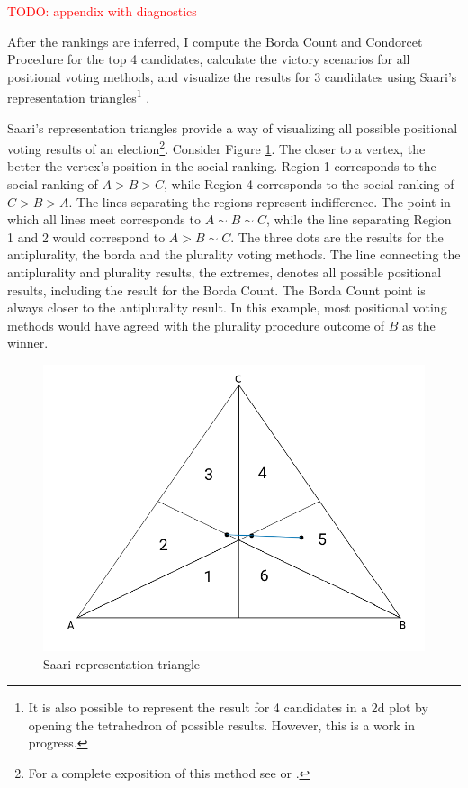 \documentclass[hidelinks,11pt]{article}
\begin{document}
\textcolor{red}{TODO: appendix with diagnostics}

After the rankings are inferred, I compute the Borda Count and Condorcet Procedure for the top
4 candidates, calculate the victory scenarios for all positional voting methods,  and visualize the results for 3 candidates using Saari's representation triangles\footnote{It is also possible to represent the result for 4 candidates in a 2d plot by opening the tetrahedron of possible results\parencite{saari2001chaotic}. However, this is a work in progress.} \parencite{saari2012geometry}.

Saari's representation triangles provide a way of visualizing all possible
positional voting results of an election\footnote{For a complete exposition of
  this method see \textcite{saari1995basic} or \textcite{nurmi2002voting}.}. Consider Figure \ref{fig:saari_nurmi}. The closer to a vertex, the better the vertex's position in the social ranking. Region 1 corresponds to the social ranking of \(A > B > C\), while Region 4 corresponds to the social ranking of \(C>B>A\). The lines separating the regions represent indifference. The point in which all lines meet corresponds to \(A \sim B \sim C\), while the line separating Region 1 and 2 would correspond to \(A > B \sim C\). The three dots are the results for the antiplurality, the borda and the plurality voting methods. The line connecting the antiplurality and plurality results, the extremes, denotes all possible positional results, including the result for the Borda Count. The Borda Count point is always closer to the antiplurality result. In this example, most positional voting methods would have agreed with the plurality procedure outcome of \(B\) as the winner.

\begin{figure}[H]
 \centering
 \includegraphics[width=0.8\columnwidth,
 height=0.3\textheight]{./images/simpletriangle.png}
 \caption{Saari representation triangle}
 \label{fig:saari_nurmi}
\end{figure}
\end{document}
